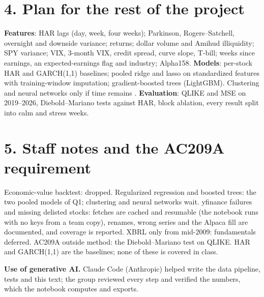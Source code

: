 \documentclass[11pt]{article}
\begin{document}
\section*{4. Plan for the rest of the project}

\textbf{Features}: HAR lags (day, week, four weeks); Parkinson, Rogers--Satchell, overnight and downside
variance; returns; dollar volume and Amihud illiquidity; SPY variance; VIX, 3-month VIX, credit spread,
curve slope, T-bill; weeks since earnings, an expected-earnings flag and industry; Alpha158.
\textbf{Models}: per-stock HAR and GARCH(1,1) baselines; pooled ridge and lasso on standardized
features with training-window imputation; gradient-boosted trees (LightGBM). Clustering and neural
networks only if time remains \citep{christensen2023ml,gu2020ml}. \textbf{Evaluation}: QLIKE and MSE on
2019--2026, Diebold--Mariano tests against HAR, block ablation, every result split into calm and
stress weeks.

\section*{5. Staff notes and the AC209A requirement}

Economic-value backtest: dropped. Regularized regression and boosted trees: the two pooled models of
Q1; clustering and neural networks wait. yfinance failures and missing delisted stocks: fetches are
cached and resumable (the notebook runs with no keys from a team copy), renames, wrong series and the
Alpaca fill are documented, and coverage is reported. XBRL only from mid-2009: fundamentals deferred.
AC209A outside method: the Diebold--Mariano test on QLIKE. HAR and GARCH(1,1) are the baselines; none
of these is covered in class.

\textbf{Use of generative AI.} Claude Code (Anthropic) helped write the data pipeline, tests and this
text; the group reviewed every step and verified the numbers, which the notebook computes and exports.

{\footnotesize


}
\end{document}
